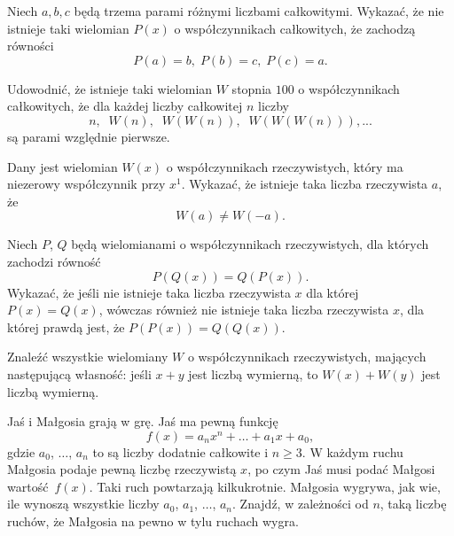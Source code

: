 \begin{problem}{1}
	Niech $a,b,c$ będą trzema parami różnymi liczbami całkowitymi. Wykazać, że nie istnieje taki wielomian $P(x)$ o współczynnikach całkowitych, że zachodzą równości
    \[
        P(a) = b,\; P(b) = c,\; P(c) = a.
    \]
\end{problem}

\begin{problem}{2}
	Udowodnić, że istnieje taki wielomian $W$ stopnia $100$ o współczynnikach całkowitych, że dla każdej liczby całkowitej $n$ liczby
	\[
		n,\;\; W(n),\;\; W(W(n)),\;\; W(W(W(n))), ...
	\]
	są parami względnie pierwsze.
\end{problem}

\begin{problem}{3}
	Dany jest wielomian $W(x)$ o współczynnikach rzeczywistych, który ma niezerowy współczynnik przy $x^1$. Wykazać, że istnieje taka liczba rzeczywista $a$, że
	\[
		W(a) \neq W(-a).
	\]
\end{problem}

\begin{problem}{4}
	Niech $P$, $Q$ będą wielomianami o współczynnikach rzeczywistych, dla których zachodzi równość 
	\[
		P(Q(x)) = Q(P(x)).
	\] 
	Wykazać, że jeśli nie istnieje taka liczba rzeczywista $x$ dla której $P(x) = Q(x)$, wówczas również nie istnieje taka liczba rzeczywista $x$, dla której prawdą jest, że $P(P(x)) = Q(Q(x))$.
\end{problem}

\begin{problem}{5}
	Znaleźć wszystkie wielomiany $W$ o współczynnikach rzeczywistych, mających następującą własność:
	jeśli $x + y$ jest liczbą wymierną, to $W(x) + W(y)$ jest liczbą wymierną.
\end{problem}

\begin{problem}{6}
	Jaś i Małgosia grają w grę. Jaś ma pewną funkcję 
	\[
		f(x)=a_n x^n + \dots + a_1x+a_0,
	\] 
	gdzie $a_0$, $\dots$, $a_n$ to są liczby dodatnie całkowite i $n\geqslant 3$. W każdym ruchu Małgosia podaje pewną liczbę rzeczywistą $x$, po czym Jaś musi podać Małgosi wartość~$f(x).$ Taki ruch powtarzają kilkukrotnie. Małgosia wygrywa, jak wie, ile wynoszą wszystkie liczby $a_0$, $a_1$, $\dots$, $a_n.$ Znajdź, w zależności od $n$, taką liczbę ruchów, że Małgosia na pewno w tylu ruchach wygra.
\end{problem}

